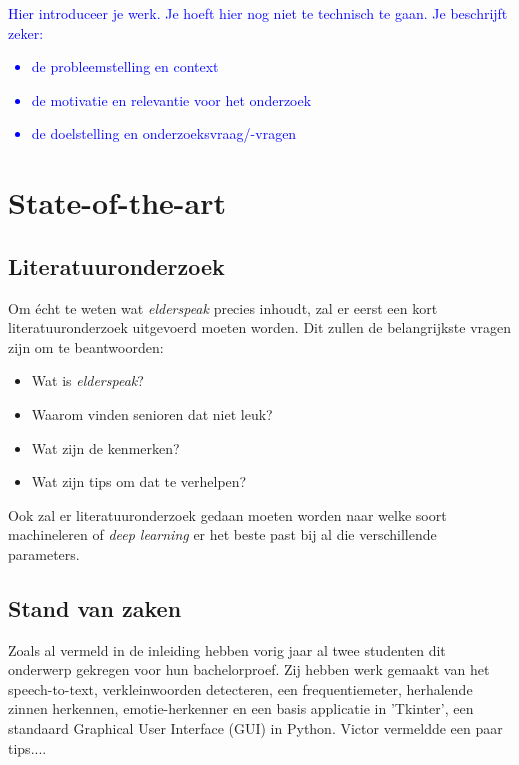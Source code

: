 \textcolor{blue}{Hier introduceer je werk. Je hoeft hier nog niet te technisch te gaan.
Je beschrijft zeker:
\begin{itemize}
  \item de probleemstelling en context
  \item de motivatie en relevantie voor het onderzoek
  \item de doelstelling en onderzoeksvraag/-vragen
\end{itemize}}


\section{State-of-the-art}
\label{sec:state-of-the-art}

\subsection{Literatuuronderzoek}
Om écht te weten wat \textit{elderspeak} precies inhoudt, zal er eerst een kort literatuuronderzoek uitgevoerd moeten worden. Dit zullen de belangrijkste vragen zijn om te beantwoorden:
\begin{itemize}
	\item Wat is \textit{elderspeak}?
	\item Waarom vinden senioren dat niet leuk?
	\item Wat zijn de kenmerken?
	\item Wat zijn tips om dat te verhelpen?
\end{itemize}

Ook zal er literatuuronderzoek gedaan moeten worden naar welke soort machineleren of \textit{deep learning} er het beste past bij al die verschillende parameters.

\subsection{Stand van zaken}
Zoals al vermeld in de inleiding hebben vorig jaar al twee studenten dit onderwerp gekregen voor hun bachelorproef. Zij hebben werk gemaakt van het speech-to-text, verkleinwoorden detecteren, een frequentiemeter, herhalende zinnen herkennen, emotie-herkenner en een basis applicatie in 'Tkinter', een standaard Graphical User Interface (GUI) in Python.
Victor vermeldde een paar tips....


